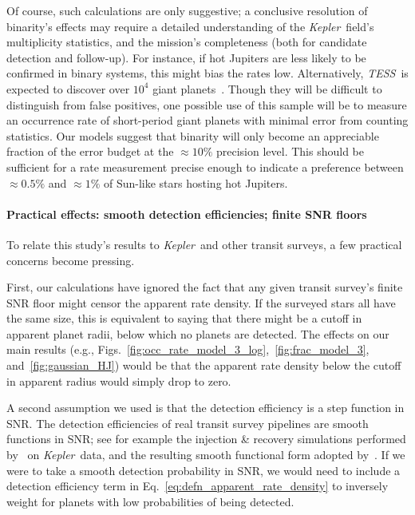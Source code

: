 \documentclass[12pt,modern]{aastex61}
\begin{document}
Of course, such calculations are only suggestive; a conclusive resolution 
of binarity's effects may require a detailed understanding of the 
{\it Kepler}\ field's multiplicity statistics, and the mission's completeness 
(both for candidate detection and follow-up).
For instance, if hot Jupiters are less likely to be confirmed in binary 
systems, this might bias the rates low.
Alternatively, {\it TESS}\ is expected to discover over $10^4$ 
giant planets~\citep{ricker_transiting_2014,sullivan_transiting_2015}.
Though they will be difficult to distinguish from false positives, one 
possible use of this sample will be to measure an occurrence rate of 
short-period giant planets with minimal error from counting statistics.
Our models suggest that binarity will only become an appreciable fraction of 
the error budget at the $\approx 10\%$ precision level.
This should be sufficient for a rate measurement precise enough to indicate a 
preference between $\approx 0.5\%$ and $\approx 1\%$ of Sun-like stars hosting 
hot Jupiters.



\paragraph{Practical effects: smooth detection efficiencies; finite SNR floors}
To relate this study's results to {\it Kepler}\ and other transit surveys, a 
few practical concerns become pressing.

First, our calculations have ignored the fact that any given transit survey's 
finite SNR floor might censor the apparent rate density.
If the surveyed stars all have the same size, this is equivalent to 
saying that there might be a cutoff in apparent planet radii, below which no 
planets are detected.
The effects on our main results (e.g., 
Figs.~\ref{fig:occ_rate_model_3_log},~\ref{fig:frac_model_3}, 
and~\ref{fig:gaussian_HJ}) would be that the apparent rate density 
below the cutoff in apparent radius would simply drop to zero.

A second assumption we used is that the detection efficiency is a 
step function in SNR.
The detection efficiencies of real transit survey pipelines are smooth 
functions in SNR; see for example the injection \& recovery simulations 
performed by~\citet{christiansen_measuring_2016} on {\it Kepler}\ data, 
and the resulting smooth functional form adopted 
by~\citet{fulton_california-_2017}.
If we were to take a smooth detection probability in SNR, we would need to 
include a detection efficiency term in 
Eq.~\ref{eq:defn_apparent_rate_density} to inversely weight for planets 
with low probabilities of being detected.
\end{document}
